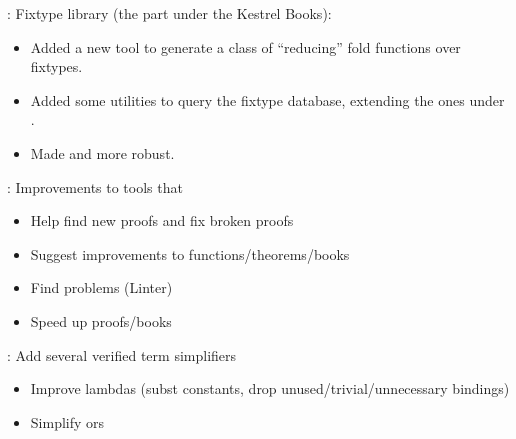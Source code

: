
\begin{frame}

\implibtitle

:
Fixtype library (the part under the Kestrel Books):
\begin{itemize}
\item Added a new  tool
      to generate a class of ``reducing'' fold functions over fixtypes.
\item Added some utilities to query the fixtype database,
      extending the ones under .
\item Made  and  more robust.
\end{itemize}

\end{frame}


\begin{frame}

\implibtitle

: Improvements to tools that
\begin{itemize}
\item Help find new proofs and fix broken proofs
\item Suggest improvements to functions/theorems/books
\item Find problems (Linter)
\item Speed up proofs/books
\end{itemize}

\end{frame}


\begin{frame}

\implibtitle

: Add several verified term simplifiers
\begin{itemize}
\item Improve lambdas (subst constants, drop unused/trivial/unnecessary bindings)
\item Simplify ors
\end{itemize}

\end{frame}

